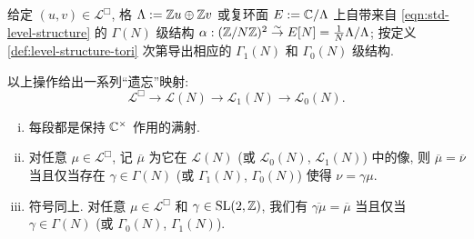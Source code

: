 给定 $(u, v) \in \mathcal{L}^\Box$, 格 $\Lambda := \mathbb{Z} u \oplus \mathbb{Z} v$ 或复环面 $E := \mathbb{C}/\Lambda$ 上自带来自 \eqref{eqn:std-level-structure} 的 $\Gamma(N)$ 级结构 $\alpha: (\mathbb{Z}/N\mathbb{Z})^2 \stackrel{\sim}{\rightarrow} E[N] = \frac{1}{N} \Lambda/\Lambda$; 按定义 \ref{def:level-structure-tori} 次第导出相应的 $\Gamma_1(N)$ 和 $\Gamma_0(N)$ 级结构.

\begin{lemma}\label{prop:tori-N-oblivion}
	以上操作给出一系列``遗忘''映射:
	\[ \mathcal{L}^\Box \to \mathcal{L}(N) \to \mathcal{L}_1(N) \to \mathcal{L}_0(N). \]
	\begin{enumerate}[(i)]
		\item 每段都是保持 $\mathbb{C}^\times$ 作用的满射.
		\item 对任意 $\mu \in \mathcal{L}^\Box$, 记 $\overline{\mu}$ 为它在 $\mathcal{L}(N)$ (或 $\mathcal{L}_0(N)$, $\mathcal{L}_1(N)$) 中的像, 则 $\overline{\mu} = \overline{\nu}$ 当且仅当存在 $\gamma \in \Gamma(N)$ (或 $\Gamma_1(N)$, $\Gamma_0(N)$) 使得 $\nu = \gamma\mu$.
		\item 符号同上. 对任意 $\mu \in \mathcal{L}^\Box$ 和 $\gamma \in \operatorname{SL}(2, \mathbb{Z})$, 我们有 $\overline{\gamma\mu} = \overline{\mu}$ 当且仅当 $\gamma \in \Gamma(N)$ (或 $\Gamma_0(N)$, $\Gamma_1(N)$).
	\end{enumerate}
\end{lemma}
